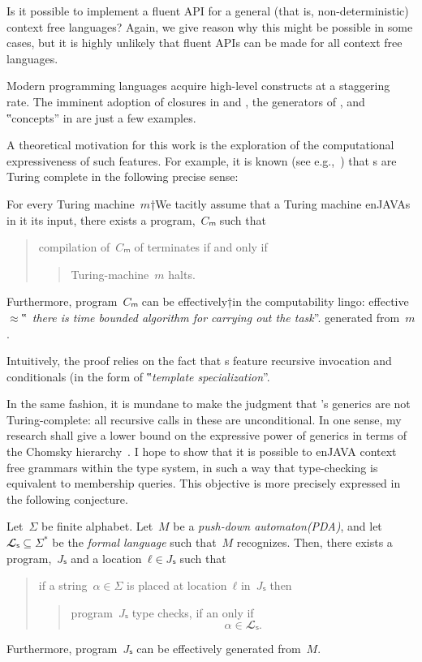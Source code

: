 Is it possible to implement a fluent API for a general 
  (that is, non-deterministic) context free languages? 
Again, we give reason why this might be possible in some cases,
  but it is highly unlikely that fluent APIs can be made for all context free languages.

Modern programming languages acquire high-level constructs
  at a staggering rate.
The imminent adoption of closures in \Java and \CC,
  the generators of \CSharp, and ‟concepts” in
  \CC are just a few examples.

A theoretical motivation for this work
  is the exploration of the computational
  expressiveness of such features.
For example, it is known (see e.g.,~\cite{Gil:Gutterman:2003}) that
  s are Turing complete in the following precise sense:

\begin{Theorem}
  \label{Theorem:Gutterman}
  For every Turing machine~$m$†{We tacitly assume that a Turing machine
    enJAVAs in it its input}, there exists a \CC program,~$Cₘ$ such that
  \begin{quote}
    compilation of~$Cₘ$ of terminates if and only if
    \begin{quote}
      Turing-machine~$m$ halts.
    \end{quote}
  \end{quote}
  Furthermore, program~$Cₘ$ can be effectively†{in the computability lingo:
    effective~$≈$‟~\emph{there is time
  bounded algorithm for carrying out the task}”.} generated from~$m$.
\end{Theorem}

Intuitively, the proof relies on the fact that s
  feature recursive invocation and conditionals (in the form of
  ‟\emph{template specialization}”.

In the same fashion, it is mundane to make the judgment that
  \Java's generics are not Turing-complete: all recursive calls
  in these are unconditional.
In one sense, my research shall give a lower bound on the
  expressive power of \Java generics in terms of the Chomsky hierarchy~\cite{Chomsky:1963}.
I hope to show that it is possible to enJAVA context free grammars within the \Java type system,
  in such a way that type-checking is equivalent to membership queries.
This objective is more precisely expressed in the following conjecture.

\begin{Theorem}
\label{Theorem:Gil-Levy}
Let~$Σ$ be finite alphabet.
Let~$M$ be a \emph{push-down automaton(PDA)}, and let~$𝓛ₛ⊆Σ^*$ be
the \emph{formal language} such that~$M$ recognizes.
Then, there exists a \Java program,~$Jₛ$ and a location~$ℓ∈Jₛ$
such that
\begin{quote}
  if a string~$α∈Σ$ is
  placed at location~$ℓ$ in~$Jₛ$ then
  \begin{quote}
    program~$Jₛ$ type checks, if an only if
    \[
      α∈𝓛ₛ.
    \]
  \end{quote}
\end{quote}
Furthermore, program~$Jₛ$ can be effectively generated from~$M$.
\end{Theorem}

